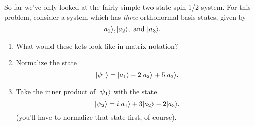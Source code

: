 \begin{problem}
So far we've only looked at the fairly simple two-state spin-1/2 system.  For this problem, consider a system which has \emph{three} orthonormal basis states, given by
\[
| a_1 \rangle, | a_2 \rangle, \text{ and }  | a_3 \rangle.
\]
\begin{enumerate}[label=(\alph*)]
\item What would these kets look like in matrix notation?
\item Normalize the state
\[
| \psi_1 \rangle = | a_1 \rangle - 2 | a_2 \rangle + 5 | a_3 \rangle.
\]
\item Take the inner product of $| \psi_1 \rangle$ with the state 
\[
| \psi_2 \rangle = i| a_1 \rangle + 3 | a_2 \rangle - 2| a_3 \rangle.
\]
(you'll have to normalize that state first, of course).
\end{enumerate}
\end{problem}

